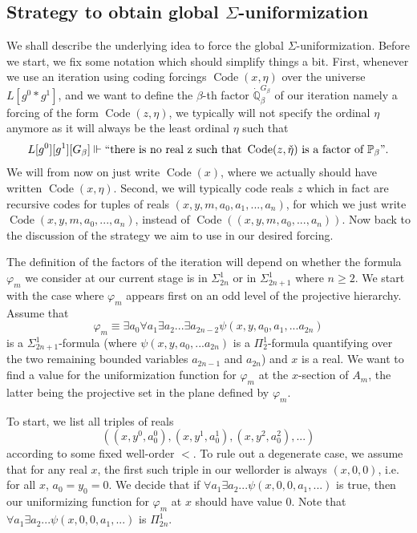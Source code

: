 \documentclass[a4paper,11pt]{article}
\newcommand{\forceP}{\mathbb{P}}
\newcommand{\forceQ}{\mathbb{Q}}
\begin{document}
\subsection{Strategy to obtain global $\Sigma$-uniformization}
We shall describe the underlying idea to force the global $\Sigma$-uniformization.
Before we start, we fix some notation which should simplify things a bit. First, whenever we use an iteration using coding forcings $\operatorname{Code} (x,\eta)$ over the  universe $L[g^0\ast g^1]$, and we want to define the $\beta$-th factor $\dot{\forceQ}_{\beta}^{G_{\beta}}$  of our iteration namely a forcing of the form $\operatorname{Code} (z,\eta)$, we typically will not specify the ordinal $\eta$ anymore as it will always be the least ordinal $\eta$ such that 
\[ L[g^0][g^1][G_{\beta}]  \Vdash ``\text{there is no real z such that } \operatorname{Code} (z, \check{\eta} ) \text{ is a factor of } \forceP_{\beta}" .\] We will from now on just write $\operatorname{Code} (x)$, where we actually should have written $\operatorname{Code}(x,\eta)$. Second, we will typically code reals $z$ which in fact are recursive codes for tuples of reals $(x,y,m, a_0,a_1,...,a_n)$, for which we just write
$\operatorname{Code} (x,y,m,a_0,...,a_n)$, instead of $\operatorname{Code} ((x,y,m,a_0,...,a_n))$. Now back to the discussion of the strategy we aim to use in our desired forcing.

The definition of the factors of the iteration will depend on whether the formula
$\varphi_m$ we consider at our current stage is in $\Sigma^1_{2n}$ or in $\Sigma^1_{2n+1}$ where $n\ge 2$. We start with the case where $\varphi_m$ appears first on an odd level of the projective hierarchy.
Assume that $$\varphi_m \equiv \exists a_0 \forall a_1 \exists a_2 ... \exists a_{2n-2} \psi( x,y,a_0,a_1,... a_{2n} )$$  is a $\Sigma^1_{2n+1}$-formula (where $\psi(x,y,a_0,...a_{2n})$ is a $\Pi^1_2$-formula quantifying over the two remaining bounded variables $a_{2n-1}$ and $a_{2n}$) and  $x$ is a real. We want to find a value for the uniformization function for $\varphi_m$ at the $x$-section of $A_m$, the latter being the projective set in the plane defined by $\varphi_m$.

To start, we list all triples of reals $$ ((x,y^0,a_0^0) , (x, y^1, a_0^1), (x,y^2,a_0^2) ,...)$$ according to some fixed well-order $<$. To rule out a degenerate case, we assume that for any real $x$, the first such triple in our wellorder is always $(x,0,0)$, i.e. for all $x$, $a_0=y_0=0$. We decide that if $\forall a_1 \exists a_2...\psi (x,0,0,a_1,...)$ is true, then our uniformizing function for $\varphi_m$ at $x$ should have value $0$. Note that $\forall a_1 \exists a_2 ... \psi(x,0,0,a_1,...)$  is $\Pi^1_{2n}$.
\end{document}
